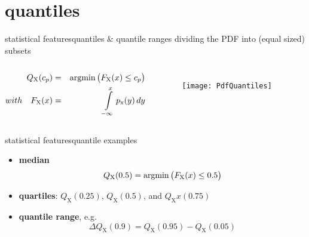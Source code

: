     \section{quantiles}
		\begin{frame}{statistical features}{quantiles \& quantile ranges}
			dividing the PDF into (equal sized) subsets
            \vspace{-3mm}
            \begin{columns}
            \begin{footnotesize}
			\begin{eqnarray*}
				Q_\mathrm{X}(c_p) &=& \operatorname*{argmin}\big (F_\mathrm{X}(x) \leq c_p\big)\\
                with\quad F_\mathrm{X}(x) &=& {\int\limits_{-\infty}^{x}{p_\mathrm{x}(y)\, dy}}
			\end{eqnarray*}
            \end{footnotesize}
            \vspace{-9mm}
			\begin{figure}
                \texttt{[image: PdfQuantiles]}
            \end{figure}
            \end{columns}
        \end{frame}
		\begin{frame}{statistical features}{quantile examples}
			\begin{itemize}
				\item	\textbf{median}
						\begin{equation*}\label{eq:median}
							Q_\mathrm{X}(0.5) = \operatorname*{argmin}\big (F_\mathrm{X}(x) \leq 0.5\big)
						\end{equation*}
				\bigskip
				\item	\textbf{quartiles}: $Q_\mathrm{X}(0.25),\, Q_\mathrm{X}(0.5)$, and $Q_\mathrm{X}x(0.75)$
				\bigskip
                \item	\textbf{quantile range}, e.g.
						\begin{equation*}
							\Delta Q_\mathrm{X}(0.9) = Q_\mathrm{X}(0.95)-Q_\mathrm{X}(0.05)
						\end{equation*}
			\end{itemize}
        \end{frame}
